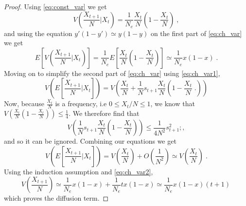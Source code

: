\documentclass[12pt]{extarticle}
\begin{document}
\begin{proof}
Using \cref{eq:const_var} we get
\begin{equation}
V\left(\frac{X_{t+1}}{N} \bigg|X_t \right) 
= \frac{1}{N_e}\frac{X_t}{N}\left(1-\frac{X_t}{N} \right) \;,
\end{equation}
and using the equation $y'(1-y') \simeq y(1-y)$ on the first part of \cref{eq:ch_var} we get
\begin{equation}\label{eq:ch_var2}
E\left[V\left(\frac{X_{t+1}}{N} \bigg|X_t \right)\right] 
= \frac{1}{N_e}E\left[\frac{X_t}{N}\left(1- \frac{X_t}{N}\right) \right] \simeq \frac{1}{N_e} x(1-x) \;.
\end{equation}
Moving on to simplify the second part of \cref{eq:ch_var} using \cref{eq:ch_var1},
\begin{equation}
V\left(E\left[\frac{X_{t+1}}{N} \bigg|X_t \right]\right) 
= V\left(\frac{X_t}{N} + \frac{1}{N}s_{t+1}\frac{X_t}{N}\left(1-\frac{X_t}{N} \;.\right) \right)
\end{equation}
Now, because $\frac{X_t}{N}$ is a frequency, i.e $0 \leq X_t/N \leq 1$, we know that $V\left(\frac{X_t}{N}\left(1-\frac{X_t}{N} \right) \right)\leq\frac{1}{4}$. We therefore find that
\begin{equation}
V\left(\frac{1}{N}s_{t+1}\frac{X_t}{N}\left(1-\frac{X_t}{N} \right) \right)
\leq \frac{1}{4N^2}s^2_{t+1} ;,
\end{equation}
and so it can be ignored.
Combining our equations we get
\begin{equation}
V\left(E\left[\frac{X_{t+1}}{N} \bigg|X_t \right]\right) 
= V\left(\frac{X_t}{N}\right) + O\left(\frac{1}{N^2}\right)\simeq V\left(\frac{X_t}{N}\right) \;.
\end{equation}
Using the induction assumption and \cref{eq:ch_var2},
\begin{equation}
V\left(\frac{X_{t+1}}{N}\right) 
\simeq \frac{1}{N_e}x(1-x) + \frac{1}{N_e}tx(1-x) \simeq \frac{1}{N_e}x(1-x)(t+1) \,
\end{equation}
which proves the diffusion term.
\end{proof}
\end{document}
